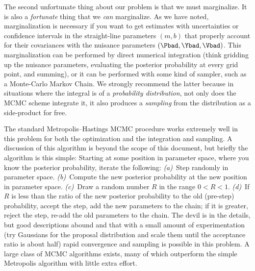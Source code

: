 \documentclass[12pt,twoside,pdftex]{article}
\begin{document}
The second unfortunate thing about our problem is that we must
marginalize.  It is also a \emph{fortunate} thing that we \emph{can}
marginalize.  As we have noted, marginalization is necessary if you
want to get estimates with uncertainties or confidence intervals in
the straight-line parameters $(m,b)$ that properly account for their
covariances with the nuisance parameters $(\Pbad,\Ybad,\Vbad)$.  This
marginalization can be performed by direct numerical integration
(think gridding up the nuisance parameters, evaluating the posterior
probability at every grid point, and summing), or it can be performed
with some kind of sampler, such as a Monte-Carlo Markov Chain.  We
strongly recommend the latter because in situations where the integral
is of a \emph{probability distribution}, not only does the MCMC scheme
integrate it, it also produces a \emph{sampling} from the distribution
as a side-product for free.

The standard Metropolis--Hastings MCMC procedure works extremely well
in this problem for both the optimization and the integration and
sampling.  A discussion of this algorithm is beyond the scope of this
document, but briefly the algorithm is this simple: Starting at some
position in parameter space, where you know the posterior probability,
iterate the following: \textsl{(a)}~Step randomly in parameter
space. \textsl{(b)}~Compute the new posterior probability at the new
position in parameter space. \textsl{(c)}~Draw a random number $R$ in
the range $0<R<1$.  \textsl{(d)}~If $R$ is less than the ratio of the
new posterior probability to the old (pre-step) probability, accept
the step, add the new parameters to the chain; if it is greater,
reject the step, re-add the old parameters to the chain.  The devil is
in the details, but good descriptions abound and that with a small amount of experimentation (try
Gaussians for the proposal distribution and scale them until the
acceptance ratio is about half) rapid convergence and sampling is
possible in this problem. A large class of MCMC algorithms exists,
many of which outperform the simple Metropolis algorithm with little
extra effort.
\end{document}

